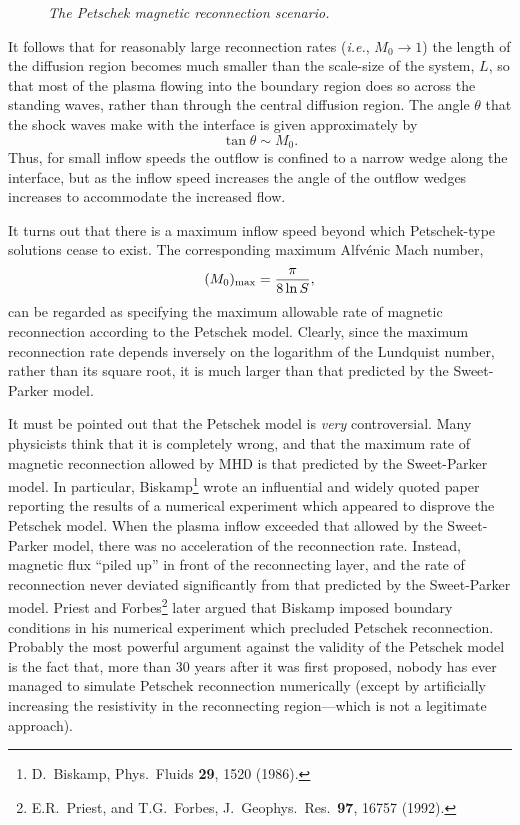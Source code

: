 \begin{figure}
\epsfysize=2.5in
\centerline{}
\caption{\em The Petschek magnetic reconnection scenario.}\label{f29}
\end{figure}

It follows that for reasonably large reconnection rates ({\em i.e.}, $M_0\rightarrow
1$) the length of the diffusion region becomes much smaller than the scale-size
of the system, $L$, so that most of the plasma flowing into the
boundary region does so across the standing waves, rather than through the central
diffusion region. The angle $\theta$ that the shock waves make with
the interface is given approximately
by
\begin{equation}
\tan\theta \sim M_0.
\end{equation}
Thus, for small inflow speeds the outflow is confined to a narrow
wedge along the interface, but as the inflow speed increases the angle
of the outflow wedges increases to accommodate the increased flow. 

It turns out that there is a maximum inflow speed beyond which Petschek-type
solutions cease to exist. The corresponding maximum Alfv\'{e}nic Mach number,
\begin{equation}
(M_0)_{\rm max} = \frac{\pi}{8 \ln S},
\end{equation}
can be regarded as specifying the maximum allowable rate of magnetic
reconnection according to  the Petschek model. Clearly, since the maximum reconnection
rate depends inversely on the logarithm of the Lundquist number, rather
than its square root, it is much larger than that predicted by the
Sweet-Parker model. 

It must be pointed out that the Petschek model is {\em very} controversial. Many
physicists think that it is completely wrong, and that the maximum 
rate of magnetic reconnection allowed by  MHD is that predicted by the
Sweet-Parker model. In particular, Biskamp\footnote{D.~Biskamp, Phys.\ Fluids
{\bf 29}, 1520 (1986).} wrote an influential and widely quoted paper reporting the
results of a numerical experiment which appeared to disprove the Petschek
model. When the plasma inflow exceeded that allowed by
the  Sweet-Parker model, there was no
acceleration of the reconnection rate. Instead, magnetic flux ``piled up''
in front of the reconnecting layer, and the rate of reconnection never deviated
significantly from that predicted by the Sweet-Parker model. Priest and
Forbes\footnote{E.R.~Priest, and T.G.~Forbes, J.\ Geophys.\ Res.\ {\bf 97}, 
16757 (1992).} later argued that Biskamp imposed boundary conditions in
his numerical experiment which precluded Petschek reconnection. Probably
the most powerful argument against the validity of the Petschek model is
the fact that, more than 30 years after it was first proposed, nobody has
ever managed to simulate Petschek reconnection numerically (except by artificially
increasing the resistivity in the reconnecting region---which is not a
legitimate approach). 

